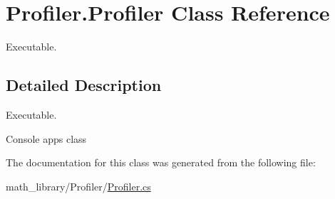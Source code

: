 \hypertarget{classProfiler_1_1Profiler}{}\section{Profiler.\+Profiler Class Reference}
\label{classProfiler_1_1Profiler}


Executable.  




\subsection{Detailed Description}
Executable. 

Console app\textquotesingle{}s class 

The documentation for this class was generated from the following file\+:\begin{DoxyCompactItemize}
\item 
math\+\_\+library/\+Profiler/\hyperlink{Profiler_8cs}{Profiler.\+cs}\end{DoxyCompactItemize}
